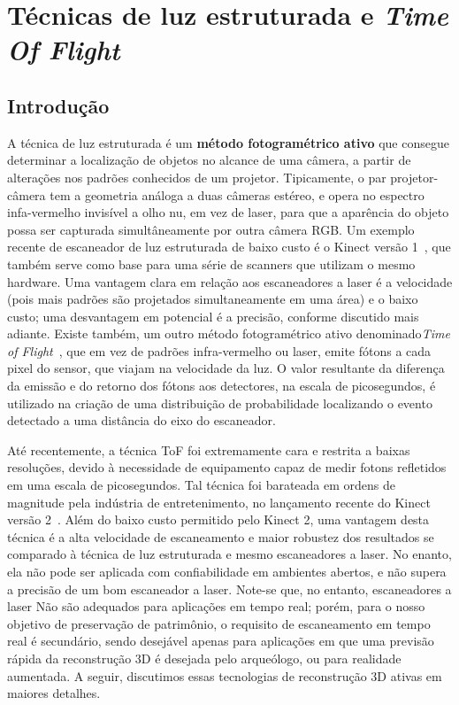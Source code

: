 \doublespacing
\chapter{Técnicas de luz estruturada e \emph{Time Of Flight}}\label{cap:kinect}
\doublespacing
\section{Introdução}

A técnica de luz estruturada é um
\textbf{método fotogramétrico ativo} que consegue determinar a localização de
objetos no alcance de uma câmera, a partir de alterações nos padrões conhecidos
de um projetor.  Tipicamente, o par projetor-câmera tem a geometria análoga a
duas câmeras estéreo, e opera no espectro infa-vermelho invisível a olho nu, em
vez de laser, para que a aparência do objeto possa ser capturada
simultâneamente por outra câmera RGB.  Um exemplo recente de escaneador de luz
estruturada de baixo custo é o Kinect versão 1~\cite{smisek20133d}, que também
serve como base para uma série de scanners que utilizam o mesmo hardware. Uma
vantagem clara em relação aos escaneadores a laser é a velocidade (pois mais padrões são projetados simultaneamente em uma área) e o
baixo custo; uma desvantagem em potencial é a precisão, conforme discutido mais adiante.
Existe também, um outro método fotogramétrico ativo denominado\emph{Time of
Flight}~\cite{gokturk2004time}, que em vez de padrões infra-vermelho ou laser,
emite fótons a cada pixel do sensor, que viajam na velocidade da luz. O valor resultante
da diferença da emissão e do retorno dos fótons aos detectores, na escala de picosegundos, é utilizado na
criação de uma distribuição de probabilidade localizando o evento detectado a
uma distância do eixo do escaneador.

Até recentemente, a técnica ToF foi extremamente cara e restrita a baixas resoluções, devido à
necessidade de equipamento capaz de medir fotons refletidos em uma escala de
picosegundos. Tal técnica foi barateada em ordens de magnitude pela indústria
de entretenimento, no lançamento recente do Kinect versão
2~\cite{lachat2015first,valgma20163d}. Além do baixo custo permitido pelo
Kinect 2, uma vantagem desta técnica é a alta velocidade de escaneamento e
maior robustez dos resultados se comparado à técnica de luz estruturada e mesmo escaneadores a laser.
No enanto, ela não pode ser aplicada com confiabilidade em ambientes abertos,
e não supera a precisão de um bom escaneador a laser. Note-se que, no entanto, escaneadores a laser Não são adequados para aplicações em tempo real; porém, para o nosso objetivo de preservação de patrimônio,
o requisito de escaneamento em tempo real é secundário, sendo desejável apenas para aplicações em que uma previsão rápida da reconstrução 3D é desejada pelo arqueólogo, ou para realidade aumentada.
A seguir, discutimos essas tecnologias de reconstrução 3D ativas em maiores detalhes.

